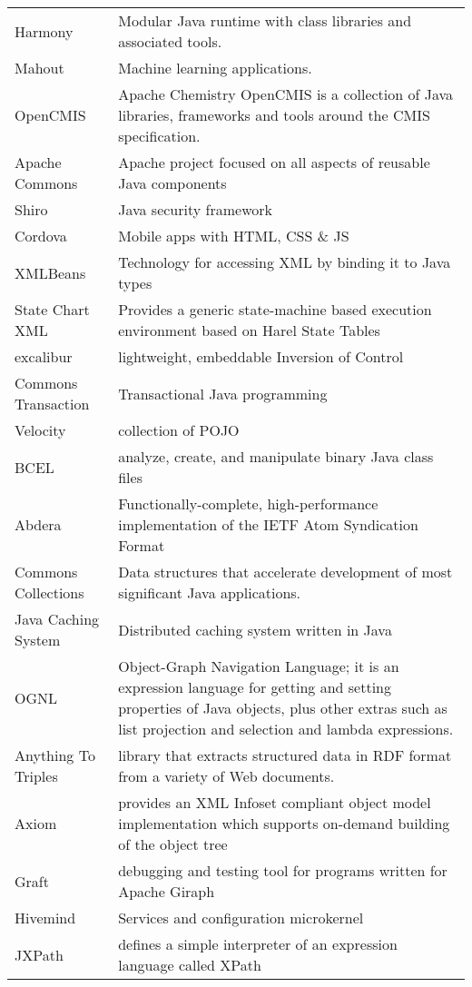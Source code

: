 {\begin{longtable}{|p{2cm} | p{14cm}|}
Harmony & Modular Java runtime with class libraries and associated tools.
\\ Mahout & Machine learning applications.
\\ OpenCMIS & Apache Chemistry OpenCMIS is a collection of Java libraries, frameworks and tools around the CMIS specification.
\\ Apache Commons &  Apache project focused on all aspects of reusable Java components
\\ Shiro & Java security framework
\\ Cordova &  Mobile apps with HTML, CSS \& JS
\\ XMLBeans & Technology for accessing XML by binding it to Java types
\\ State Chart XML & Provides a generic state-machine based execution environment based on Harel State Tables
\\ excalibur & lightweight, embeddable Inversion of Control
\\ Commons Transaction & Transactional Java programming
\\ Velocity & collection of POJO
\\ BCEL & analyze, create, and manipulate binary Java class files
\\ Abdera & Functionally-complete, high-performance implementation of the IETF Atom Syndication Format
\\ Commons Collections &  Data structures that accelerate development of most significant Java applications.
\\ Java Caching System & Distributed caching system written in Java
\\ OGNL & Object-Graph Navigation Language; it is an expression language for getting and setting properties of Java objects, plus other extras such as list projection and selection and lambda expressions.
\\ Anything To Triples & library that extracts structured data in RDF format from a variety of Web documents.
\\ Axiom & provides an XML Infoset compliant object model implementation which supports on-demand building of the object tree
\\ Graft & debugging and testing tool for programs written for Apache Giraph
\\ Hivemind &  Services and configuration microkernel
\\ JXPath & defines a simple interpreter of an expression language called XPath


\hline

\end{longtable}}

\twocolumn
